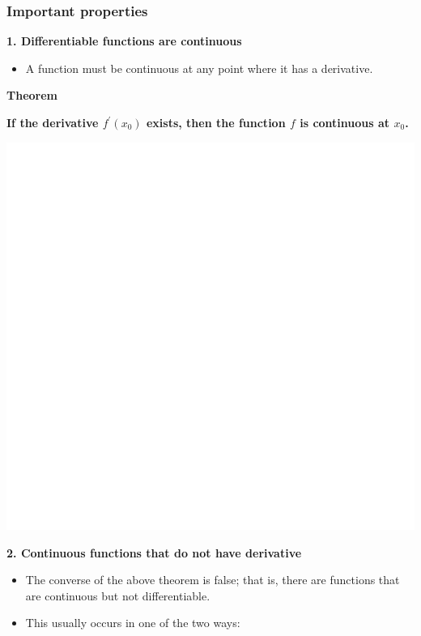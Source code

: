 \documentclass[]{book}
\providecommand{\tightlist}{%
  \setlength{\itemsep}{0pt}\setlength{\parskip}{0pt}}
\begin{document}
\hypertarget{important-properties}{%
\subsubsection{Important properties}\label{important-properties}}

\textbf{1. Differentiable functions are continuous}

\begin{itemize}
\tightlist
\item
  A function must be continuous at any point where it has a derivative.
\end{itemize}

\newpage

\textbf{Theorem}

\textbf{If the derivative \(f^\prime(x_0)\) exists, then the function \(f\) is continuous at \(x_{0}\).}

\begin{center}\includegraphics[width=1\linewidth]{figure/Devbox3-1} \end{center}

\textbf{2. Continuous functions that do not have derivative}

\begin{itemize}
\item
  The converse of the above theorem is false; that is, there are functions that are continuous but not differentiable.
\item
  This usually occurs in one of the two ways:
\end{itemize}
\end{document}
